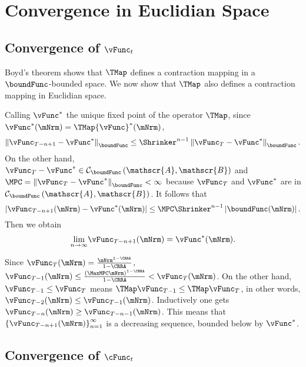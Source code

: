 \documentclass[\econtexRoot/BufferStockTheory]{subfiles}
\begin{document}
\section{Convergence in Euclidian Space}
\subsection{Convergence of
  \texorpdfstring{$\vFunc_{t}$}{vFunc-{t}}}\label{sec:vEuclidian}

Boyd's theorem shows that $\TMap$ defines a contraction mapping
in a $\boundFunc$-bounded space. We now show that $\TMap$ also
defines a contraction mapping in Euclidian space.

Calling $\vFunc^{\ast}$ the unique fixed point of the operator $\TMap$, since $\vFunc^{\ast }(\mNrm)=\TMap {\vFunc}^{\ast }(\mNrm)$,
\begin{equation}
\left\Vert \vFunc_{T-n+1}-\vFunc^{\ast }\right\Vert _{\boundFunc }\leq \Shrinker
^{n-1}\left\Vert \vFunc_{T}-\vFunc^{\ast }\right\Vert _{\boundFunc }.
\end{equation}%
On the other hand, $\vFunc_{T}-\vFunc^{\ast }\in \mathcal{C}_{\boundFunc }\left( \mathscr{A},
\mathscr{B}\right) $ and $\MPC =\left\Vert \vFunc_{T}-\vFunc^{\ast }\right\Vert_{\boundFunc }<\infty $ because $\vFunc_{T}$ and $\vFunc^{\ast }$ are in $\mathcal{C}_{\boundFunc
}\left( \mathscr{A},\mathscr{B}\right) $. It follows that%
\begin{equation}
\left\vert \vFunc_{T-n+1}(\mNrm)-\vFunc^{\ast }(\mNrm)\right\vert \leq \MPC \Shrinker^{n-1}\left\vert \boundFunc(\mNrm)\right\vert.
\end{equation}%
Then we obtain
\begin{equation}
\underset{n\rightarrow \infty }{\lim }\vFunc_{T-n+1}(\mNrm)=\vFunc^{\ast }(\mNrm).
\end{equation}

Since $\vFunc_{T}(\mNrm)=\frac{\mNrm^{1-\CRRA }}{1-\CRRA }$, $\vFunc_{T-1}(\mNrm)\leq \frac{{\left(\MaxMPC \mNrm\right)}^{1-\CRRA}}{1-\CRRA}<\vFunc_{T}(\mNrm)$. On the other hand, $\vFunc_{T-1}\leq \vFunc_{T}$
means $\TMap\vFunc_{T-1}\leq \TMap\vFunc_{T}$, in other words, $\vFunc_{T-2}(\mNrm)\leq \vFunc_{T-1}(\mNrm)$.
Inductively one gets $\vFunc_{T-n}(\mNrm)\geq \vFunc_{T-n-1}(\mNrm)$. This means that $\left\{
\vFunc_{T-n+1}(\mNrm)\right\} _{n=1}^{\infty }$ is a decreasing sequence,
bounded below by $\vFunc^{\ast}$.


\subsection{Convergence of
  \texorpdfstring{$\cFunc_{t}$}{cFunc-{t}}}\label{subsec:cConverges}%
\end{document}
